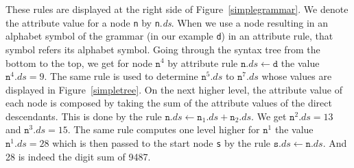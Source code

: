 These rules are displayed at the right side
of Figure~\ref{simplegrammar}. 
We denote the attribute value for a node \texttt{n} by \texttt{n}.\textit{ds}. When we use a node resulting in an alphabet symbol of the grammar (in our example \texttt{d}) in an attribute rule,
that symbol refers its alphabet symbol.
Going through the syntax tree from the bottom to the top, we get for 
node $\texttt{n}^4$
by attribute rule $\texttt{n}.\textit{ds} \leftarrow \texttt{d}$ the value %
 $\texttt{n}^4.\textit{ds}=9$. The same rule is used to determine $\texttt{n}^5.\textit{ds}$ to $\texttt{n}^7.\textit{ds}$
 whose values are displayed in Figure~\ref{simpletree}.
On the next higher level, the attribute value of each node is composed by taking the sum of the attribute values of the direct descendants. This is done by the 
rule $\texttt{n}.\textit{ds}\leftarrow \texttt{n}_1.\textit{ds}+\texttt{n}_2.\textit{ds} $. %
We get
 $\texttt{n}^2.\textit{ds}=13$ and
 $\texttt{n}^3.\textit{ds}=15$.
The same rule computes one level higher for $\texttt{n}^1$ the value
$
  \texttt{n}^1.\textit{ds}=28
$
which is then passed to the start node \texttt{s} by the rule $\texttt{s}.\textit{ds}\leftarrow \texttt{n}.\textit{ds}$.
And 28 is indeed the digit sum of 9487.


